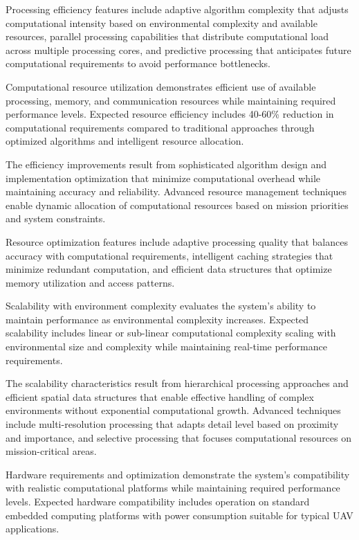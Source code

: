 Processing efficiency features include adaptive algorithm complexity that adjusts computational intensity based on environmental complexity and available resources, parallel processing capabilities that distribute computational load across multiple processing cores, and predictive processing that anticipates future computational requirements to avoid performance bottlenecks.

Computational resource utilization demonstrates efficient use of available processing, memory, and communication resources while maintaining required performance levels. Expected resource efficiency includes 40-60\% reduction in computational requirements compared to traditional approaches through optimized algorithms and intelligent resource allocation.

The efficiency improvements result from sophisticated algorithm design and implementation optimization that minimize computational overhead while maintaining accuracy and reliability. Advanced resource management techniques enable dynamic allocation of computational resources based on mission priorities and system constraints.

Resource optimization features include adaptive processing quality that balances accuracy with computational requirements, intelligent caching strategies that minimize redundant computation, and efficient data structures that optimize memory utilization and access patterns.

Scalability with environment complexity evaluates the system's ability to maintain performance as environmental complexity increases. Expected scalability includes linear or sub-linear computational complexity scaling with environmental size and complexity while maintaining real-time performance requirements.

The scalability characteristics result from hierarchical processing approaches and efficient spatial data structures that enable effective handling of complex environments without exponential computational growth. Advanced techniques include multi-resolution processing that adapts detail level based on proximity and importance, and selective processing that focuses computational resources on mission-critical areas.

Hardware requirements and optimization demonstrate the system's compatibility with realistic computational platforms while maintaining required performance levels. Expected hardware compatibility includes operation on standard embedded computing platforms with power consumption suitable for typical UAV applications.

